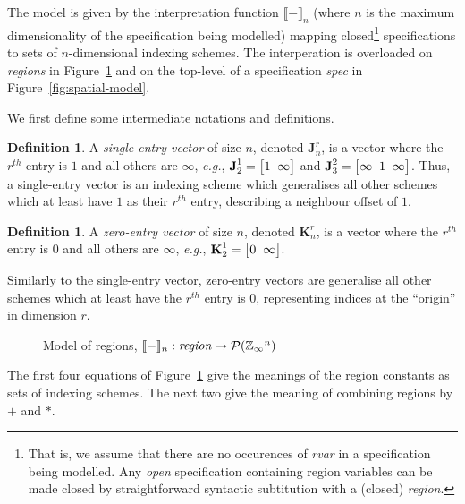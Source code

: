 \documentclass[9pt]{sigplanconf}
\newcounter{block}
\theoremstyle{definition}
\newtheorem{definition}[block]{Definition}
\newcommand{\eg}{\emph{e.g.}}
\newcommand{\interp}[1]{\llbracket{#1}\rrbracket}
\newcommand{\term}[1]{\texttt{#1}}
\newcommand{\vtwoh}[2]{\setlength{\arraycolsep}{0em}
\left[\begin{array}{cc}#1 \; & \; #2\end{array}\right]}
\newcommand{\vthreeh}[3]{\setlength{\arraycolsep}{0em}
\left[\begin{array}{ccc}#1 \; & \; #2 \; & \; #3\end{array}\right]}
\newcommand{\singleEntry}[2]{\textbf{J}_{#2}^{#1}}
\newcommand{\zeroEntry}[2]{\textbf{K}_{#2}^{#1}}
\begin{document}
The model is given by the interpretation function $\interp{-}_n$
(where $n$ is the maximum dimensionality of the specification being
modelled) mapping closed\footnote{That is, we assume that there are no
  occurences of \textit{rvar} in a specification being modelled.  Any
  \emph{open} specification containing region variables can be made
  closed by straightforward syntactic subtitution with a (closed) 
  \textit{region}.} specifications to sets of
$n$-dimensional indexing schemes. The interperation is overloaded on
\emph{regions} in Figure~\ref{fig:region-model} and on the top-level
of a specification \textit{spec} in Figure~\ref{fig:spatial-model}.

We first define some intermediate notations and definitions.

\begin{definition}A \emph{single-entry vector} of size $n$, denoted
$\singleEntry{r}{n}$, is a vector where the $r^{th}$ entry is $1$
and all others are $\infty$, \eg{}, $\singleEntry{1}{2} =
\vtwoh{1}{\infty}$ and $\singleEntry{2}{3} = \vthreeh{\infty}{1}{\infty}$.
Thus, a single-entry vector is an indexing scheme which generalises 
all other schemes which at least have $1$ as their $r^{th}$ entry,
describing a neighbour offset of $1$. 
\end{definition}

\begin{definition}A \emph{zero-entry vector} of size $n$, denoted
$\zeroEntry{r}{n}$, is a vector where the $r^{th}$ entry is $0$ and all others
are $\infty$, \eg{}, $\zeroEntry{1}{2} = \vtwoh{0}{\infty}$.

Similarly to the single-entry vector, zero-entry vectors 
are generalise all other schemes
which at least have the $r^{th}$ entry is $0$, representing indices at
the ``origin'' in dimension $r$. 
\end{definition}


\begin{figure}

\caption{Model of regions, 
$\interp{-}_n : \textit{region} \rightarrow \mathcal{P}(\domainVal{}^n)$}
\label{fig:region-model}
\end{figure}

\noindent
The first four equations of Figure~\ref{fig:region-model}
give the meanings of the region constants as sets of indexing
schemes. The next two give the meaning of combining regions
by $\term{+}$ and $\term{*}$. 
\end{document}
